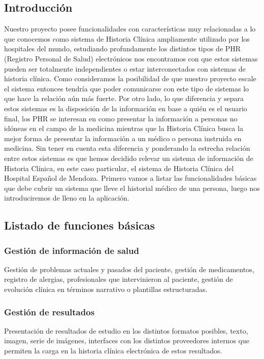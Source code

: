 {\correccionTexto
\subsection{Introducción}
Nuestro proyecto posee funcionalidades con características muy relacionadas a lo que conocemos como sistema de Historia Clínica ampliamente utilizado por los hospitales del mundo, estudiando profundamente los distintos tipos de PHR (Registro Personal de Salud) electrónicos nos encontramos con que estos sistemas pueden ser totalmente independientes o estar interconectados con sistemas de historia clínica. Como consideramos la posibilidad de que nuestro proyecto escale el sistema entonces tendría que poder comunicarse con este tipo de sistemas lo que hace la relación aún más fuerte. Por otro lado, lo que diferencia y separa estos sistemas es la disposición de la información en base a quién es el usuario final, los PHR se interesan en como presentar la información a personas no idóneas en el campo de la medicina mientras que la Historia Clínica busca la mejor forma de presentar la información a un médico o persona instruida en medicina. Sin tener en cuenta esta diferencia y ponderando la estrecha relación entre estos sistemas es que hemos decidido relevar un sistema de información de Historia Clínica, en este caso particular, el sistema de Historia Clínica del Hospital Español de Mendoza.
Primero vamos a listar las funcionalidades básicas que debe cubrir un sistema que lleve el historial médico de una persona, luego nos introduciremos de lleno en la aplicación.
}

\subsection{Listado de funciones básicas}

\subsubsection{Gestión de información de salud}
Gestión de problemas actuales y pasados del paciente, gestión de medicamentos, registro de alergias, profesionales que intervinieron al paciente, gestión de evolución clínica en términos narrativo o plantillas estructuradas.

\subsubsection{Gestión de resultados}
Presentación de resultados de estudio en los distintos formatos posibles, texto, imagen, serie de imágenes, interfaces con los distintos proveedores internos que permiten la carga en la historia clínica electrónica de estos resultados.

